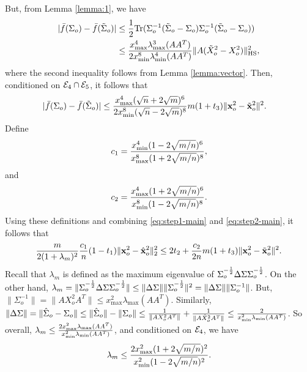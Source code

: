 \documentclass[onecolumn]{IEEEtran}
\newcommand{\xvh}{\hat{\xv}}
\newcommand{\xvt}{\tilde{\xv}}
\begin{document}
But, from Lemma \ref{lemma:1}, we have
\begin{align}
|\bar{f}(\Sigma_o)-\bar{f}(\tilde{\Sigma}_o)|&\leq {1\over 2}{\rm Tr}(\Sigma_o^{-1}(\tilde{\Sigma}_o-\Sigma_o)\Sigma_o^{-1}(\tilde{\Sigma}_o-\Sigma_o))\nonumber\\
&\leq {x^4_{\max} \lambda^3_{\max}(AA^T) \over 2 {x_{\min}^8} \lambda^4_{\min}(AA^T)  }\|A(\tilde{X}^2_o-X^2_o)\|^2_{\rm HS},\label{eq:step1-main}
\end{align}
where the second inequality  follows from Lemma \ref{lemma:vector}. Then, conditioned on $\mathcal{E}_4\cap\mathcal{E}_5$, it follows that 
\begin{align}
|\bar{f}(\Sigma_o)-\bar{f}(\tilde{\Sigma}_o)|&\leq  {x^4_{\max}(\sqrt{n}+2\sqrt{m})^6  \over 2 {x_{\min}^8}  (\sqrt{n}-2\sqrt{m})^8  }m(1+t_3)\|\xv_o^2-{\xvt^2_o}\|^2.\label{eq:step2-main}
\end{align}
Define 
\[
c_1 = {x^4_{\min} (1 -2 \sqrt{m/n})^6 \over x^8_{\max} (1 +2 \sqrt{m/n})^8  },
\]
and
\[
c_2 =  {x^4_{\max}(1+2\sqrt{m/n})^6  \over{x_{\min}^8}  (1-2\sqrt{m/n})^8  }.
\]
Using these definitions and combining \eqref{eq:step1-main} and \eqref{eq:step2-main}, it follows that 
\begin{align}
 {m \over 2(1+\lambda_{m})^2} {c_1\over n} (1-t_1)\| \xv_o^2- \xvh^2_o\|_2^2 \leq   2t_2+{c_2\over 2n}   m(1+t_3)\|\xv^2_o-{\xvt^2_o}\|^2.\label{eq:step3-main}
\end{align}
Recall that $\lambda_{m}$ is defined as the maximum eigenvalue of $\Sigma_o^{-{1\over 2}}\Delta \Sigma\Sigma_o^{-{1\over 2}}$. On the other hand, $\lambda_m=\|\Sigma_o^{-{1\over 2}}\Delta \Sigma\Sigma_o^{-{1\over 2}}\|\leq \|\Delta \Sigma\| \|\Sigma_o^{-{1\over 2}}\|^2 = \|\Delta \Sigma\| \|\Sigma_o^{-1}\|$. But, $ \|\Sigma_o^{-1}\|=\|AX_o^2A^T\|\leq x^2_{\max}\lambda_{\max}(AA^T)$. Similarly, $\|\Delta \Sigma\|=\|\hat{\Sigma}_o-{\Sigma}_o\| \leq \|\hat{\Sigma}_o\|-\|{\Sigma}_o\| \leq {1\over \|AX_o^2A^T\|}+{1\over \|A\hat{X}_o^2A^T\|}\leq {2\over x^2_{\min}\lambda_{\min}(AA^T)}$. So overall, $\lambda_m\leq {2x^2_{\max}\lambda_{\max}(AA^T)\over x^2_{\min}\lambda_{\min}(AA^T)}$, and conditioned on $\mathcal{E}_4$, we have
\begin{align}
\lambda_m\leq {2x^2_{\max}(1+2\sqrt{m/n})^2\over x^2_{\min}(1-2\sqrt{m/n})^2}.\label{eq:def-lambda-m}
\end{align}
\end{document}
